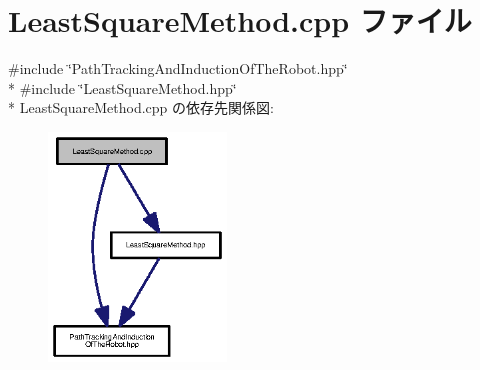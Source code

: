 \section{Least\-Square\-Method.\-cpp ファイル}
\label{_least_square_method_8cpp}
{\ttfamily \#include \char`\"{}Path\-Tracking\-And\-Induction\-Of\-The\-Robot.\-hpp\char`\"{}}\\*
{\ttfamily \#include \char`\"{}Least\-Square\-Method.\-hpp\char`\"{}}\\*
Least\-Square\-Method.\-cpp の依存先関係図\-:\nopagebreak
\begin{figure}[H]
\begin{center}
\leavevmode
\includegraphics[width=134pt]{_least_square_method_8cpp__incl}
\end{center}
\end{figure}
